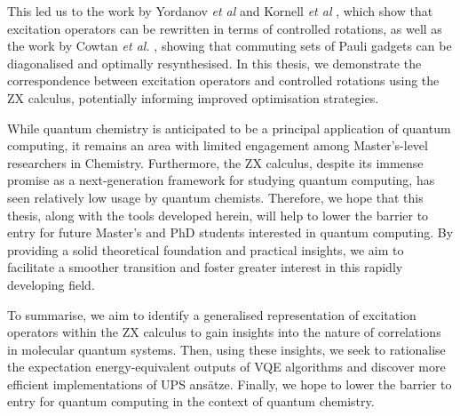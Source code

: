 This led us to the work by Yordanov \textit{et al} \cite{Yordanov2020} and Kornell \textit{et al} \cite{Kornell2023}, which show that excitation operators can be rewritten in terms of controlled rotations, as well as the work by Cowtan \textit{et al.} \cite{Cowtan2020}, showing that commuting sets of Pauli gadgets can be diagonalised and optimally resynthesised. In this thesis, we demonstrate the correspondence between excitation operators and controlled rotations using the ZX calculus, potentially informing improved optimisation strategies.

While quantum chemistry is anticipated to be a principal application of quantum computing, it remains an area with limited engagement among Master's-level researchers in Chemistry. Furthermore, the ZX calculus, despite its immense promise as a next-generation framework for studying quantum computing, has seen relatively low usage by quantum chemists. Therefore, we hope that this thesis, along with the tools developed herein, will help to lower the barrier to entry for future Master's and PhD students interested in quantum computing. By providing a solid theoretical foundation and practical insights, we aim to facilitate a smoother transition and foster greater interest in this rapidly developing field.

To summarise, we aim to identify a generalised representation of excitation operators within the ZX calculus to gain insights into the nature of correlations in molecular quantum systems. Then, using these insights, we seek to rationalise the expectation energy-equivalent outputs of VQE algorithms and discover more efficient implementations of UPS ansätze. Finally, we hope to lower the barrier to entry for quantum computing in the context of quantum chemistry.
